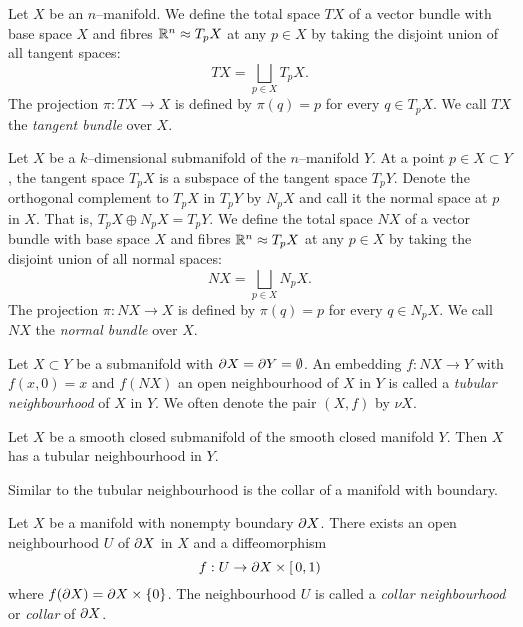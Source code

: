 \begin{defn}
	Let $X$ be an $n$--manifold.
	We define the total space $TX$ of a vector bundle with base space $X$ and fibres $\mathbb{R}^n\approx T_p X$ at any $p\in X$ by taking the disjoint union of all tangent spaces:
	\[
		TX = \bigsqcup_{p\in X} T_p X.
	\]
	The projection $\pi:TX\to X$ is defined by $\pi(q)=p$ for every $q\in T_p X$.
	We call $TX$ the \emph{tangent bundle} over $X$.
\end{defn}

\begin{defn}
	Let $X$ be a $k$--dimensional submanifold of the $n$--manifold $Y$.
	At a point $p\in X\subset Y$, the tangent space $T_p X$ is a subspace of the tangent space $T_p Y$.
	Denote the orthogonal complement to $T_p X$ in $T_p Y$ by $N_p X$ and call it the normal space at $p$ in $X$.
	That is, $T_p X\oplus N_p X = T_p Y$.
	We define the total space $NX$ of a vector bundle with base space $X$ and fibres $\mathbb{R}^n\approx T_p X$ at any $p\in X$ by taking the disjoint union of all normal spaces:
	\[
		NX = \bigsqcup_{p\in X} N_p X.
	\]
	The projection $\pi:NX\to X$ is defined by $\pi(q)=p$ for every $q\in N_p X$.
	We call $NX$ the \emph{normal bundle} over $X$.	
\end{defn}

\begin{defn}
	\label{def:tubularneighbourhood}
	Let $X\subset Y$ be a submanifold with $\partial X = \partial Y = \emptyset$.
	An embedding $f:NX\to Y$ with $f(x,0)=x$ and $f(NX)$ an open neighbourhood of $X$ in $Y$ is called a \emph{tubular neighbourhood} of $X$ in $Y$.
	We often denote the pair $(X,f)$ by $\nu X$.
\end{defn}

\begin{theorem}
	\label{thm:tubularneighbourhood}
	Let $X$ be a smooth closed submanifold of the smooth closed manifold $Y$.
	Then $X$ has a tubular neighbourhood in $Y$.
\end{theorem}

Similar to the tubular neighbourhood is the collar of a manifold with boundary.

\begin{prop}[Collars]
	\label{defthm:collar}
	Let $X$ be a manifold with nonempty boundary $\partial X$.
	There exists an open neighbourhood $U$ of $\partial X$ in $X$ and a diffeomorphism
	\[
	f: U \to \partial X\times[\,0,1)
	\]
	where $f(\partial X)=\partial X\times \{0\}$.
	The neighbourhood $U$ is called a \emph{collar neighbourhood} or \emph{collar} of $\partial X$.	
\end{prop}

